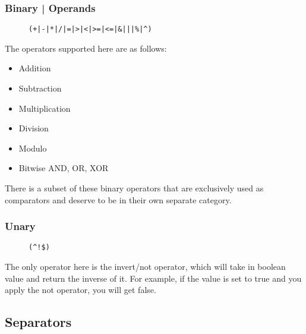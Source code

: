 \documentclass{article}
\begin{document}
\subsubsection{Binary | Operands}
\begin{flushleft}
\begin{figure}[!htpb]
\centering
\begin{Verbatim}[frame=single]
(+|-|*|/|=|>|<|>=|<=|&|||%|^)
\end{Verbatim}
\end{figure}

\begin{flushleft}
The operators supported here are as follows:
\begin{itemize}
\item Addition
\item Subtraction
\item Multiplication
\item Division
\item Modulo
\item Bitwise AND, OR, XOR
\end{itemize}

There is a subset of these binary operators that are exclusively used as comparators and deserve to be in their own separate category.

\end{flushleft}


\subsubsection{Unary}
\begin{flushleft}
\begin{figure}[!htpb]
\centering
\begin{Verbatim}[frame=single]
(^!$)
\end{Verbatim}
\end{figure}

The only operator here is the invert/not operator, which will take in boolean value and return the inverse of it.
For example, if the value is set to true and you apply the not operator, you will get false.
\end{flushleft}

\newpage


\newpage

\subsection{Separators}


\end{flushleft}
\end{document}
